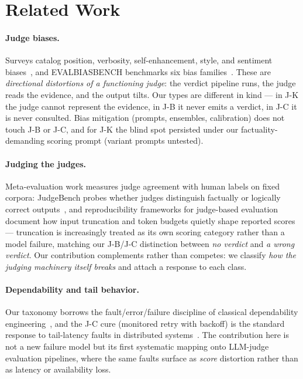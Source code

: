 \documentclass[11pt]{article}
\begin{document}
\section{Related Work}
\label{sec:related}

\paragraph{Judge biases.}
Surveys catalog position, verbosity, self-enhancement, style, and sentiment
biases~\cite{gu2024survey,positionbias,verbositybias,selfenhancement}, and
EVALBIASBENCH benchmarks six bias families~\cite{evalbiasbench}. These are
\emph{directional distortions of a functioning judge}: the verdict pipeline
runs, the judge reads the evidence, and the output tilts. Our types are
different in kind --- in J-K the judge cannot represent the evidence, in J-B
it never emits a verdict, in J-C it is never consulted. Bias mitigation
(prompts, ensembles, calibration) does not touch J-B or J-C, and for J-K the
blind spot persisted under our factuality-demanding scoring prompt (variant
prompts untested).

\paragraph{Judging the judges.}
Meta-evaluation work measures judge agreement with human labels on fixed
corpora: JudgeBench probes whether judges distinguish factually or logically
correct outputs~\cite{judgebench}, and reproducibility frameworks for
judge-based evaluation document how input truncation and token budgets
quietly shape reported scores~\cite{judgeevalrepro} --- truncation is
increasingly treated as its own scoring category rather than a model
failure, matching our J-B/J-C distinction between \emph{no verdict} and
\emph{a wrong verdict}. Our contribution complements rather than competes:
we classify \emph{how the judging machinery itself breaks} and attach a
response to each class.

\paragraph{Dependability and tail behavior.}
Our taxonomy borrows the fault/error/failure discipline of classical
dependability engineering~\cite{avizienis2004}, and the J-C cure (monitored
retry with backoff) is the standard response to tail-latency faults in
distributed systems~\cite{dean2013tail}. The contribution here is not a new
failure model but its first systematic mapping onto LLM-judge evaluation
pipelines, where the same faults surface as \emph{score} distortion rather
than as latency or availability loss.
\end{document}
